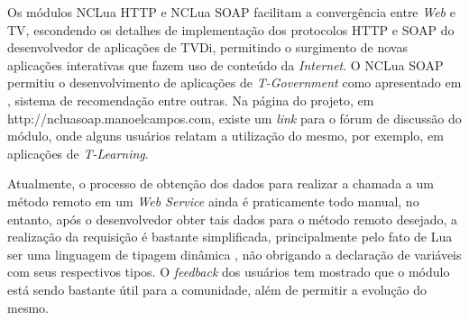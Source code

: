 Os módulos NCLua HTTP e NCLua SOAP facilitam a convergência entre \textit{Web} e TV, escondendo
os detalhes de implementação dos protocolos HTTP e SOAP do desenvolvedor
de aplicações de TVDi, permitindo o surgimento de novas aplicações interativas 
que fazem uso de conteúdo da \textit{Internet}.
O NCLua SOAP permitiu o desenvolvimento de aplicações de \textit{T-Government}
como apresentado em \cite{tgov2010barbosa}, sistema de recomendação\cite{gatto2010BIPODiTVR} entre outras. 
Na página do projeto, em http://ncluasoap.manoelcampos.com,
existe um \textit{link} para o fórum de discussão do módulo, onde alguns usuários relatam a
utilização do mesmo, por exemplo, em aplicações de \textit{T-Learning}.

Atualmente, o processo de obtenção dos dados para realizar a chamada a um método remoto em um \textit{Web Service}
ainda é praticamente todo manual, no entanto, 
após o desenvolvedor obter tais dados para o método remoto desejado, a realização da requisição é bastante simplificada,
principalmente pelo fato de Lua ser uma linguagem de tipagem dinâmica \cite{ierusalimschy2006programming}, 
não obrigando a declaração de variáveis com seus respectivos tipos.
O \textit{feedback} dos usuários tem mostrado que o módulo está sendo bastante útil para 
a comunidade, além de permitir a evolução do mesmo.
